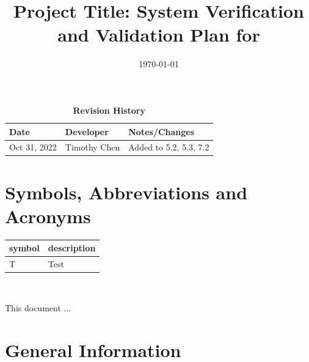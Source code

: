 \documentclass[12pt, titlepage]{article}
\begin{document}
\title{Project Title: System Verification and Validation Plan for \progname{}} 
\author{\authname}
\date{\today}
	
\maketitle


\begin{table}[H]
  \caption{\bf Revision History}
  \begin{tabularx}{\textwidth}{p{2.5cm}p{2.5cm}X}
  \toprule {\bf Date} & {\bf Developer} & {\bf Notes/Changes}\\
  \midrule
  Oct 31, 2022 & Timothy Chen & Added to 5.2, 5.3, 7.2\\
  \bottomrule
  \end{tabularx}
  \end{table}
  

\newpage

\tableofcontents

\listoftables
{}

\listoffigures
{}

\newpage

\section{Symbols, Abbreviations and Acronyms}

\renewcommand{\arraystretch}{1.2}
\begin{tabular}{l l} 
  \toprule		
  \textbf{symbol} & \textbf{description}\\
  \midrule 
  T & Test\\
  \bottomrule
\end{tabular}\\


\newpage


This document ... 

\section{General Information}
\end{document}
